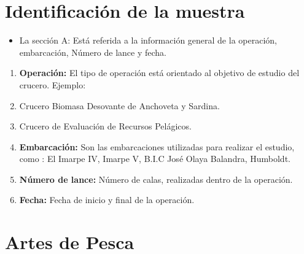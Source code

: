 \documentclass[a4paper,oneside,11pt]{book}
\begin{document}
  \section{Identificación de la muestra}
  
   \begin{figure} [!h]
    \begin{center}
    \end{center}
    \end{figure}
  
  \begin{itemize}
  \item La sección A: Está referida a la información general de la operación, embarcación, Número de lance y fecha.
 \end{itemize}
 
 \begin{enumerate}
 \item\textbf{ Operación:} El tipo de operación está orientado al objetivo de estudio del crucero. Ejemplo: 
 \item [] Crucero Biomasa Desovante de Anchoveta y Sardina.
 \item[] Crucero de Evaluación de Recursos Pelágicos.
 \item \textbf{Embarcación:} Son las embarcaciones utilizadas para realizar el estudio, como : El  Imarpe IV, Imarpe V, B.I.C José Olaya Balandra, Humboldt.
 
 \item\textbf{Número de lance:} Número de calas, realizadas dentro de la operación.
 \item \textbf{Fecha:} Fecha de inicio y final de la operación.

\end{enumerate} 
 



\section{Artes de Pesca}

\begin{figure} [!h]
  \begin{center}
  \end{center}
  \end{figure}
\end{document}
